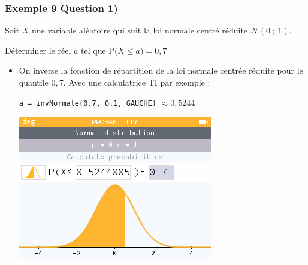 \documentclass[xcolor=svgnames,t,final]{beamer}
\newcommand{\loinorm}[2]{\mathcal{N}\left(#1\ ; \ #2 \right)}
\newcommand{\proba}[1]{\text{P}\big(#1\big)}
\begin{document}
\begin{frame}
\frametitle{Exemple 9 Question 1)}
\label{exemple9}
Soit $X$ une variable aléatoire qui suit la loi normale centré réduite $\loinorm{0}{1}$.

Déterminer le réel $a$ tel que  $\proba{X \leqslant a}=0,7$ 
\begin{itemize}
\pause \item 
On inverse la fonction de répartition de la loi normale centrée réduite pour le quantile $0,7$. Avec une calculatrice TI par exemple : 

 \texttt{a = invNormale(0.7, 0.1, GAUCHE)} $\approx 0,5244$

\begin{center}
\includegraphics[scale=0.3]{images/exemple9-fig1.png}
\end{center}
\end{itemize}

\end{frame}
\end{document}
